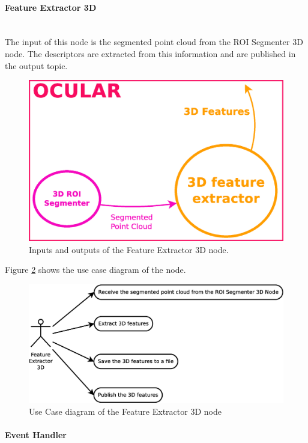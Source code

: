 
\paragraph{Feature Extractor 3D}\mbox{}\\

	The input of this node is the segmented point cloud from the ROI Segmenter 3D node. The descriptors are extracted from this information and are published in the output topic. 
	\\
		\begin{figure}[H]
			\begin{center}
			\includegraphics[width=0.5\linewidth]{img/diagrams/node_fe3d.eps}
			\caption[Feature Extractor 3D node I/O]{Inputs and outputs of the Feature Extractor 3D node.}		
			\label{node_fe3d}
			\end{center}
		\end{figure}

	Figure \ref{uc_fe3d} shows the use case diagram of the node. 

	\begin{figure}[H]
		\centering
			\includegraphics[scale=0.4]{img/diagrams/uc_feature_extractor_3d.eps}
			\caption[Use case diagram Feature Extractor 3D node]{Use Case diagram of the Feature Extractor 3D node}
		\label{uc_fe3d}
	\end{figure}


\paragraph{Event Handler}\mbox{}\\

